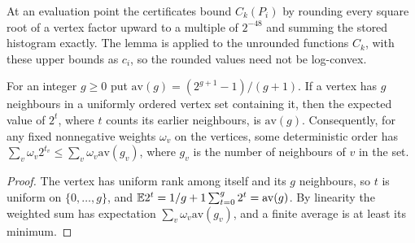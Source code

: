 At an evaluation point the certificates bound $C_k(P_i)$ by rounding every square
root of a vertex factor upward to a multiple of $2^{-48}$ and summing the stored
histogram exactly. The lemma is applied to the unrounded functions $C_k$, with these
upper bounds as $c_i$, so the rounded values need not be log-convex.

\begin{lemma}\label{lem:cover:order}
For an integer $g\ge0$ put $\mathrm{av}(g)=(2^{g+1}-1)/(g+1)$. If a vertex has $g$
neighbours in a uniformly ordered vertex set containing it, then the expected value
of $2^t$, where $t$ counts its earlier neighbours, is $\mathrm{av}(g)$. Consequently,
for any fixed nonnegative weights $\omega_v$ on the vertices, some deterministic
order has $\sum_v\omega_v2^{t_v}\le\sum_v\omega_v\mathrm{av}(g_v)$, where $g_v$ is
the number of neighbours of $v$ in the set.
\end{lemma}

\begin{proof}
The vertex has uniform rank among itself and its $g$ neighbours, so $t$ is uniform
on $\{0,\dots,g\}$, and $\mathbb E2^t=1/g+1\sum_{t=0}^g2^t=\mathrm{av}(g)$. By
linearity the weighted sum has expectation $\sum_v\omega_v\mathrm{av}(g_v)$, and a
finite average is at least its minimum.
\end{proof}

